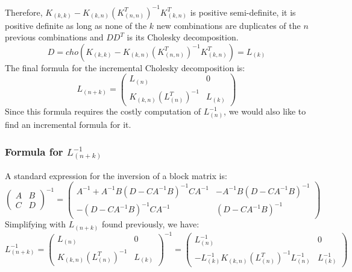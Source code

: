 Therefore, $K_{(k,k)} - K_{(k,n)} (K_{(n,n)}^T)^{-1} K_{(k,n)}^T$ is positive semi-definite, it is positive definite as long as none of the $k$ new combinations are duplicates of the $n$ previous combinations and $D D^T$ is its Cholesky decomposition.
\begin{equation*}
  D = cho(K_{(k,k)} - K_{(k,n)} (K_{(n,n)}^T)^{-1} K_{(k,n)}^T) = L_{(k)}
\end{equation*}
The final formula for the incremental Cholesky decomposition is:
\begin{equation}
  L_{(n+k)} = 
  \begin{pmatrix}
    L_{(n)} & 0 \\
    K_{(k,n)} (L_{(n)}^T)^{-1} & L_{(k)}
  \end{pmatrix}
\end{equation}
Since this formula requires the costly computation of $L_{(n)}^{-1}$, we would also like to find an incremental formula for it.

\subsubsection[Formula for the inverse Cholesky decomposition]{Formula for $L_{(n+k)}^{-1}$}

A standard expression for the inversion of a block matrix is:
\begin{equation*}
  \begin{pmatrix}
    A & B \\
    C & D
  \end{pmatrix}^{-1} = 
  \begin{pmatrix}
    A^{-1} + A^{-1} B (D - C A^{-1} B)^{-1} C A^{-1} & - A^{-1} B (D - C A^{-1} B)^{-1} \\
    - (D - C A^{-1} B)^{-1} C A^{-1} & (D - C A^{-1} B)^{-1}
  \end{pmatrix}
\end{equation*}
Simplifying with $L_{(n+k)}$ found previously, we have:
\begin{equation}
  L_{(n+k)}^{-1} =
  \begin{pmatrix}
    L_{(n)} & 0 \\
    K_{(k,n)} (L_{(n)}^T)^{-1} & L_{(k)}
  \end{pmatrix}^{-1} = 
  \begin{pmatrix}
    L_{(n)}^{-1} & 0 \\
    - L_{(k)}^{-1} K_{(k,n)} (L_{(n)}^T)^{-1} L_{(n)}^{-1} & L_{(k)}^{-1}
  \end{pmatrix}
\end{equation}


